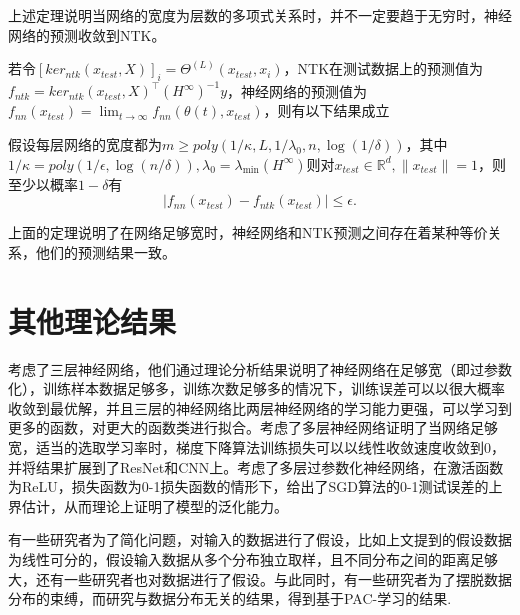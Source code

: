\par
上述定理说明当网络的宽度为层数的多项式关系时，并不一定要趋于无穷时，神经网络的预测收敛到NTK。
\par
若令$[ker_{ntk}(x_{test},X)]_i = \Theta^{(L)}(x_{test},x_i)$，NTK在测试数据上的预测值为$f_{ntk} = ker_{ntk}(x_{test},X)^\top (H^\infty)^{-1}y$，神经网络的预测值为$f_{nn}(x_{test}) = \lim_{t\rightarrow \infty} f_{nn}(\theta(t),x_{test})$，则有以下结果成立
\begin{theorem}
假设每层网络的宽度都为$m\geq poly(1/\kappa,L,1/\lambda_0, n, \log(1/\delta))$，其中$1/\kappa = poly(1/\epsilon,\log(n/\delta)),\lambda_0 = \lambda_{\min}(H^\infty)$则对$x_{test}\in \mathbb{R}^d,\|x_{test}\|=1$，则至少以概率$1-\delta$有
\[
|f_{nn}(x_{test})-f_{ntk}(x_{test})|\leq \epsilon.
\]
\end{theorem}
\par
上面的定理说明了在网络足够宽时，神经网络和NTK预测之间存在着某种等价关系，他们的预测结果一致\cite{arora2019exact}。
\section{其他理论结果}
\citet{allen2019learning}考虑了三层神经网络，他们通过理论分析结果说明了神经网络在足够宽（即过参数化），训练样本数据足够多，训练次数足够多的情况下，训练误差可以以很大概率收敛到最优解，并且三层的神经网络比两层神经网络的学习能力更强，可以学习到更多的函数，对更大的函数类进行拟合。\citet{du2018gradient}考虑了多层神经网络证明了当网络足够宽，适当的选取学习率时，梯度下降算法训练损失可以以线性收敛速度收敛到0，并将结果扩展到了ResNet和CNN上。\citet{cao2019generalization}考虑了多层过参数化神经网络，在激活函数为ReLU，损失函数为0-1损失函数的情形下，给出了SGD算法的0-1测试误差的上界估计，从而理论上证明了模型的泛化能力。
\par
有一些研究者为了简化问题，对输入的数据进行了假设，比如上文提到的\citet{brutzkus2017sgd}假设数据为线性可分的，\citet{li2018learning}假设输入数据从多个分布独立取样，且不同分布之间的距离足够大，还有一些研究者也对数据进行了假设\cite{ge2017learning,kawaguchi2016deep}。与此同时，有一些研究者为了摆脱数据分布的束缚，而研究与数据分布无关的结果，得到基于PAC-学习的结果\cite{neyshabur2017pac,allen2019learning,pitas2019better,arora2018stronger}.